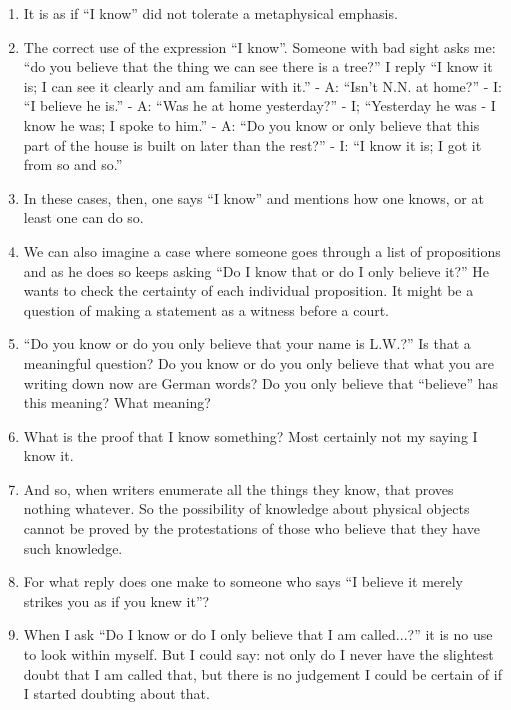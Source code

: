 \documentclass{book}
\begin{document}
\begin{enumerate}
\item
It is as if ``I know'' did not tolerate a metaphysical emphasis.

\item
The correct use of the expression ``I know''. Someone with bad sight asks me:
``do you believe that the thing we can see there is a tree?'' I reply ``I know
it is; I can see it clearly and am familiar with it.'' - A: ``Isn't N.N. at
home?'' - I: ``I believe he is.'' - A: ``Was he at home yesterday?'' - I;
``Yesterday he was - I know he was; I spoke to him.'' - A: ``Do you know or
only believe that this part of the house is built on later than the rest?'' -
I: ``I know it is; I got it from so and so.''

\item
In these cases, then, one says ``I know'' and mentions how one knows, or at
least one can do so.

\item
We can also imagine a case where someone goes through a list of propositions
and as he does so keeps asking ``Do I know that or do I only believe it?'' He
wants to check the certainty of each individual proposition. It might be a
question of making a statement as a witness before a court.

\item
``Do you know or do you only believe that your name is L.W.?'' Is that a
meaningful question?  Do you know or do you only believe that what you are
writing down now are German words? Do you only believe that ``believe'' has
this meaning? What meaning?

\item
What is the proof that I know something? Most certainly not my saying I know
it.

\item
And so, when writers enumerate all the things they know, that proves nothing
whatever.  So the possibility of knowledge about physical objects cannot be
proved by the protestations of those who believe that they have such knowledge.

\item
For what reply does one make to someone who says ``I believe it merely strikes
you as if you knew it''?

\item
When I ask ``Do I know or do I only believe that I am called...?'' it is no use
to look within myself.  But I could say: not only do I never have the slightest
doubt that I am called that, but there is no judgement I could be certain of if
I started doubting about that.


\end{enumerate}
\end{document}
